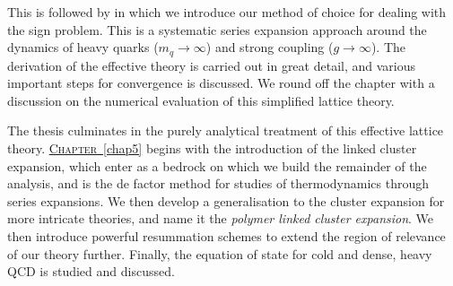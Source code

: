 This is followed by  in which we introduce our method of choice
for dealing with the sign problem. This is a systematic series expansion
approach around the dynamics of heavy quarks ($m_q \to \infty$) and strong
coupling ($g \to \infty$). The derivation of the effective theory is carried out
in great detail, and various important steps for convergence is discussed. We
round off the chapter with a discussion on the numerical evaluation of this
simplified lattice theory.

The thesis culminates in the purely analytical treatment of this effective
lattice theory. \hyperref[chap5]{\mbox{\textsc{Chapter} \ref*{chap5}}} begins
with the introduction of the linked cluster expansion, which enter as a bedrock
on which we build the remainder of the analysis, and is the de factor method for
studies of thermodynamics through series expansions. We then develop a
generalisation to the cluster expansion for more intricate theories, and name it
the \emph{polymer linked cluster expansion}. We then introduce powerful
resummation schemes to extend the region of relevance of our theory further.
Finally, the equation of state for cold and dense, heavy QCD is studied and
discussed.
